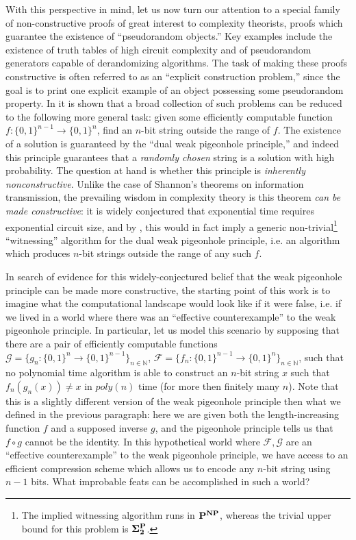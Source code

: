 \documentclass[11pt]{article}
\newcommand{\B}{\{0,1\}}
\def\cl{\bf}
\begin{document}
With this perspective in mind, let us now turn our attention to a special family of non-constructive proofs of great interest to complexity theorists, proofs which guarantee the existence of ``pseudorandom objects.'' Key examples include the existence of truth tables of high circuit complexity and of pseudorandom generators capable of derandomizing algorithms. The task of making these proofs constructive is often referred to as an ``explicit construction problem,'' since the goal is to print one explicit example of an object possessing some pseudorandom property. In \cite{Korten} it is shown that a broad collection of such problems can be reduced to the following more general task: given some efficiently computable function $f\colon \B^{n-1} \rightarrow \B^n$, find an $n$-bit string outside the range of $f$. The existence of a solution is guaranteed by the ``dual weak pigeonhole principle,'' and indeed this principle guarantees that a \emph{randomly chosen} string is a solution with high probability. The question at hand is whether this principle is \emph{inherently nonconstructive}. Unlike the case of Shannon's theorems on information transmission, the prevailing wisdom in complexity theory is this theorem \emph{can be made constructive}: it is widely conjectured that exponential time requires exponential circuit size, and by \cite{Korten}, this would in fact imply a generic non-trivial\footnote{The implied witnessing algorithm runs in ${\cl P}^{\cl NP}$, whereas the trivial upper bound for this problem is ${\cl \Sigma_2^P}$.} ``witnessing'' algorithm for the dual weak pigeonhole principle, i.e. an algorithm which produces $n$-bit strings outside the range of any such $f$. 

In search of evidence for this widely-conjectured belief that the weak pigeonhole principle can be made more constructive, the starting point of this work is to imagine what the computational landscape would look like if it were false, i.e. if we lived in a world where there was an ``effective counterexample'' to the weak pigeonhole principle. In particular, let us model this scenario by supposing that there are a pair of efficiently computable functions  $\mathcal{G} = \{g_n \colon \B^{n} \rightarrow \B^{n-1}\}_{n \in \mathbb{N}}$, $\mathcal{F} = \{f_n \colon \B^{n-1} \rightarrow \B^n\}_{n \in \mathbb{N}}$, such that no polynomial time algorithm is able to construct an $n$-bit string $x$ such that $f_n(g_n(x)) \neq x$ in $poly(n)$ time (for more then finitely many $n$). Note that this is a slightly different version of the weak pigeonhole principle then what we defined in the previous paragraph: here we are given both the length-increasing function $f$ and a supposed inverse $g$, and the pigeonhole principle tells us that $f \circ g$ cannot be the identity.
In this hypothetical world where $\mathcal{F}, \mathcal{G}$ are an ``effective counterexample'' to the weak pigeonhole principle, we have access to an efficient compression scheme which allows us to encode any $n$-bit string using $n-1$ bits. What improbable feats can be accomplished in such a world? 
\end{document}

